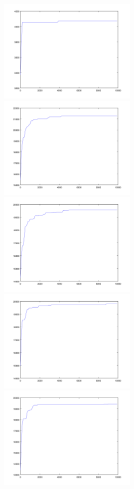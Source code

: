 \documentclass[9pt,conference]{IEEEtran}
\begin{document}
\includegraphics[width=0.5\textwidth]{images/graf_test_in.png}
\includegraphics[width=0.5\textwidth]{images/graf_1.png}
\includegraphics[width=0.5\textwidth]{images/graf_50.png}
\includegraphics[width=0.5\textwidth]{images/graf_78.png}
\includegraphics[width=0.5\textwidth]{images/graf_90.png}
\end{document}
